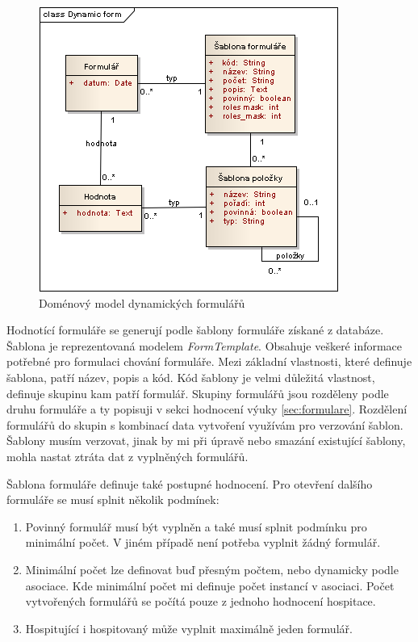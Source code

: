 \begin{figure}[h]
\begin{center}
\includegraphics[scale=0.6]{figures/Dynamic_form}
\caption{Doménový model dynamických formulářů}
\label{fig:dynamicform}
\end{center}
\end{figure}

Hodnotící formuláře se generují podle šablony formuláře získané z databáze. Šablona je reprezentovaná modelem \textit{FormTemplate}. Obsahuje veškeré informace potřebné pro formulaci chování formuláře. Mezi základní vlastnosti, které definuje šablona, patří název, popis a kód. Kód šablony je velmi důležitá vlastnost, definuje skupinu kam patří formulář. Skupiny formulářů jsou rozděleny podle druhu formuláře a ty popisuji v sekci hodnocení výuky \ref{sec:formulare}. Rozdělení formulářů do skupin s kombinací data vytvoření využívám pro verzování šablon. Šablony musím verzovat, jinak by mi při úpravě nebo smazání existující šablony, mohla nastat ztráta dat z vyplněných formulářů.


Šablona formuláře definuje také postupné hodnocení. Pro otevření dalšího formuláře se musí splnit několik podmínek:

\begin{enumerate}
\item Povinný formulář musí být vyplněn a také musí splnit podmínku pro minimální počet. V jiném případě není potřeba vyplnit žádný formulář.
\item Minimální počet lze definovat buď přesným počtem, nebo dynamicky podle asociace. Kde minimální počet mi definuje počet instancí v asociaci. Počet vytvořených formulářů se počítá pouze z jednoho hodnocení hospitace.
\item Hospitující i hospitovaný může vyplnit maximálně jeden formulář.
\end{enumerate}

